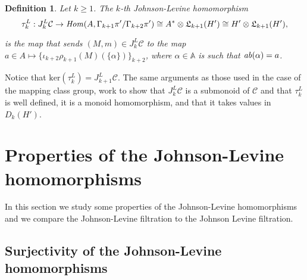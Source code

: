 \documentclass[10pt]{amsart}
\numberwithin{equation}{section}
\numberwithin{equation}{section}
\newtheorem{definition}[theorem]{Definition}
\theoremstyle{definition}
\begin{document}
\begin{definition} Let $k\geq 1$. The $k$-th  \emph{Johnson-Levine homomorphism}
\begin{equation}\label{ecuacion3.22}%
\tau_k^L:J_k^L\mathcal{C}\rightarrow\text{\emph{Hom}}(A,\Gamma_{k+1}\pi'/\Gamma_{k+2}\pi')\cong A^*\otimes \mathfrak{L}_{k+1}(H')\cong H'\otimes \mathfrak{L}_{k+1}(H'),
\end{equation}

\noindent is the map that sends $(M,m)\in J_k^L\mathcal{C}$ to the map   $a\in A\mapsto \{\iota_{k+2}\rho_{k+1}(M)(\{\alpha\})\}_{k+2}$, where  $\alpha\in\mathbb{A}$ is such that $\text{\emph{ab}}(\alpha)=a$.
\end{definition}

Notice that $\text{ker}(\tau_k^L)=J_{k+1}^L\mathcal{C}$. The same arguments as those used in the case of the mapping class group, work to show that $J_k^L\mathcal{C}$ is a submonoid of $\mathcal{C}$ and that $\tau_k^L$ is well defined, it is a monoid homomorphism, and that it takes values in $D_k(H')$.



\section{Properties of the Johnson-Levine homomorphisms}\label{seccion4}
In this section we study some properties of the Johnson-Levine homomorphisms and we compare the Johnson-Levine filtration to the  Johnson Levine filtration.


\subsection{Surjectivity of the  Johnson-Levine homomorphisms}
\end{document}
